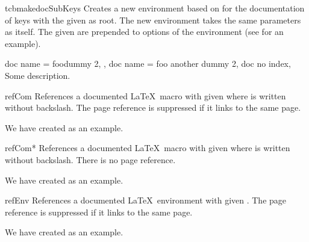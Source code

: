 \begin{docCommand}[doc new and updated={2020-04-22}{2023-12-01}]{tcbmakedocSubKeys}{}
  Creates a new environment  based on  for the
  documentation of keys with the given  as root.
  The new environment  takes the same para\-meters as  itself.
  The given  are prepended to options of the  environment
  (see  for an example).
\begin{dispExample}

\begin{docFooKeys}[
    doc parameter eq meta = nothing,
    doc description init empty,
  ]
  {
    {
      doc name = foodummy 2,
    },
    {
      doc name = foo another dummy 2,
      doc no index,
    }
  }
Some description.
\end{docFooKeys}
\end{dispExample}
\end{docCommand}


\clearpage

\begin{docCommand}{refCom}{}
  References a documented \LaTeX\ macro with given  where  is
  written without backslash. The page reference is suppressed if it links
  to the same page.
\begin{dispExample}
We have created  as an example.
\end{dispExample}
\end{docCommand}

\begin{docCommand}{refCom*}{}
  References a documented \LaTeX\ macro with given  where  is
  written without backslash. There is no page reference.
\begin{dispExample}
We have created  as an example.
\end{dispExample}
\end{docCommand}


\begin{docCommand}{refEnv}{}
  References a documented \LaTeX\ environment with given .
  The page reference is suppressed if it links to the same page.
\begin{dispExample}
We have created  as an example.
\end{dispExample}
\end{docCommand}

